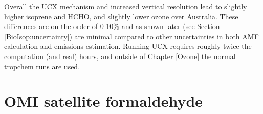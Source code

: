 
Overall the UCX mechanism and increased vertical resolution lead to slightly higher isoprene and HCHO, and slightly lower ozone over Australia.
These differences are on the order of 0-10\% and as shown later (see Section \ref{BioIsop:uncertainty}) are minimal compared to other uncertainties in both AMF calculation and emissions estimation.
Running UCX requires roughly twice the computation (and real) hours, and outside of Chapter \ref{Ozone} the normal tropchem runs are used.







\section{OMI satellite formaldehyde}
\label{Model:omhcho}
  
